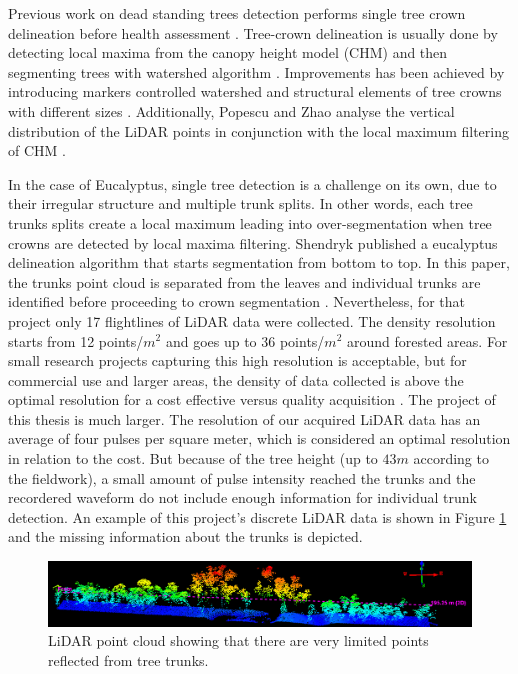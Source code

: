 \documentclass{subfiles}
\begin{document}
\par Previous work on dead standing trees detection performs single tree crown delineation before health assessment \cite{Yao2012} \cite{Shendryk2016_DeadTrees}. Tree-crown delineation is usually done by detecting local maxima from the canopy height model (CHM) and then segmenting trees with watershed algorithm \cite{Popescu2003}. Improvements has been achieved by introducing markers controlled watershed \cite{Jing2012} and structural elements of tree crowns with different sizes \cite{Hu2014}. Additionally, Popescu and Zhao analyse the vertical distribution of the LiDAR points in conjunction with the local maximum filtering of CHM \cite{Popescu2008}.


\par  In the case of Eucalyptus, single tree detection is a challenge on its own, due to their irregular structure and multiple trunk splits. In other words, each tree trunks splits create a local maximum leading into over-segmentation when tree crowns are detected by local maxima filtering. Shendryk published a eucalyptus delineation algorithm that starts segmentation from bottom to top. In this paper, the trunks point cloud is separated from the leaves and individual trunks are identified before proceeding to crown segmentation \cite{Shendryk2016_treeDeliniation}. Nevertheless, for that project only 17 flightlines of LiDAR data were collected. The density resolution starts from 12 points/$m^2$ and goes up to 36 points/$m^2$ around forested areas. For small research projects capturing this high resolution is acceptable, but for commercial use and larger areas, the density of data collected is above the optimal resolution for a cost effective versus quality acquisition \cite{Lovell2005}. The project of this thesis is much larger. The resolution of our acquired LiDAR data has an average of four pulses per square meter,{\color{blue} which is considered an optimal resolution in relation to the cost}. But because of the tree height (up to $43m$ according to the fieldwork), a small amount of pulse intensity reached the trunks and the recordered waveform do not include enough information for individual trunk detection.  An example of this project's discrete LiDAR data is shown in Figure \ref{fig:NoTrunks} and the missing information about the trunks is depicted.

\begin{figure} [h!]
	\centering
	\includegraphics[trim={7cm 0 1.7cm 0},clip,width=\textwidth]{img/dead/TreesNoTrunks}
	\caption{LiDAR point cloud showing that there are very limited points reflected from tree trunks.}
	\label{fig:NoTrunks}
\end{figure}
\end{document}

